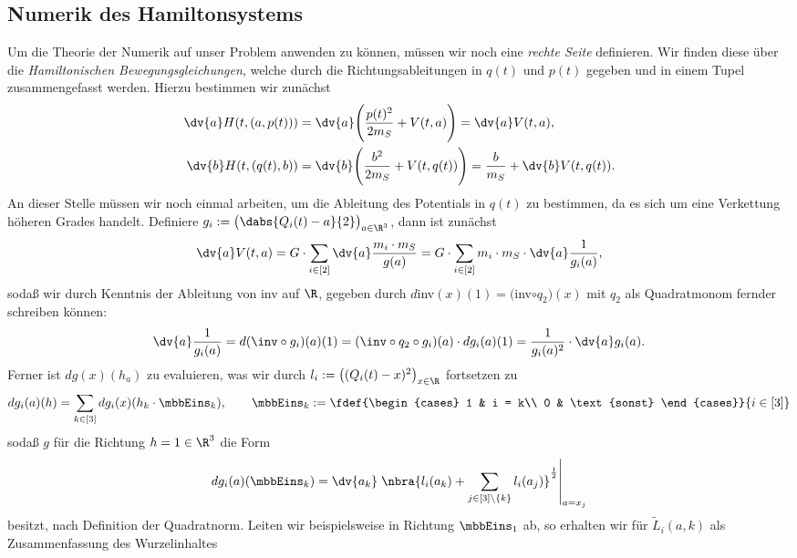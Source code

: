 \documentclass{subfiles}
\begin{document}
    \subsection*{Numerik des Hamiltonsystems}
        Um die Theorie der Numerik auf unser Problem anwenden zu können, müssen wir noch eine \emph{rechte Seite} definieren. Wir finden diese über die \emph{Hamiltonischen Bewegungsgleichungen}, welche durch die Richtungsableitungen in $q(t)$ und $p(t)$ gegeben und in einem Tupel zusammengefasst werden. Hierzu bestimmen wir zunächst
        \begin{align*}
            \dv{a}H(t,(a,p(t))) &= \dv{a}\Biggl(
                \frac{p(t)^2}{2m_S} + V(t,a)
            \Biggr) = \dv{a}V(t,a),\\
            \dv{b}H(t,(q(t),b)) &= \dv{b}\Biggl(
                \frac{b^2}{2m_S} + V(t,q(t))
            \Biggr) = \frac{b}{m_S} + \dv{b}V(t,q(t)).
        \end{align*}    
        An dieser Stelle müssen wir noch einmal arbeiten, um die Ableitung des Potentials in $q(t)$ zu bestimmen, da es sich um eine Verkettung höheren Grades handelt. Definiere $g_i:=\bigl(\dabs{Q_i(t)-a}{2}\bigr)_{a\in\R^3}$, dann ist zunächst
        \[
            \dv{a}V(t,a) = G\cdot\sum_{i\in[2]}\dv{a}\frac{m_i\cdot m_S}{g(a)} = G\cdot\sum_{i\in[2]}m_i\cdot m_S\cdot\dv{a}\frac{1}{g_i(a)},
        \]
        sodaß wir durch Kenntnis der Ableitung von inv auf $\R$, gegeben durch $d$inv$(x)(1) = ($inv$\circ q_2)(x)$ mit $q_2$ als Quadratmonom fernder schreiben können:
        \[
            \dv{a}\frac{1}{g_i(a)} = d(\inv\circ g_i)(a)(1) = (\inv\circ q_2\circ g_i)(a)\cdot dg_i(a)(1) = \frac{1}{g_i(a)^2}\cdot \dv{a}g_i(a).  
        \]
        Ferner ist $dg(x)(h_a)$ zu evaluieren, was wir durch $l_{i}:=\bigl((Q_i(t) - x)^2\bigr)_{x\in\R}$ fortsetzen zu
        \[
            dg_i(a)(h) = \sum_{k\in[3]}dg_i(x)(h_k\cdot\mbbEins_k), \qquad\mbbEins_{k}:=\fdef{\begin{cases}
                1 & i = k\\
                0 & \text{sonst}
            \end{cases}}{i\in[3]}
        \]
        sodaß $g$ für die Richtung $h=1\in\R^3$ die Form 
        \[
            dg_i(a)(\mbbEins_k) = \dv{a_k}\left.\nbra{l_i(a_k) + \sum_{j\in[3]\setminus{\{k\}}}l_{i}(a_j)}^{\frac12}\right|_{a = x_j}
        \]
        besitzt, nach Definition der Quadratnorm. Leiten wir beispielsweise in Richtung $\mbbEins_1$ ab, so erhalten wir für $\tilde L_i(a,k)$ als Zusammenfassung des Wurzelinhaltes
\end{document}

